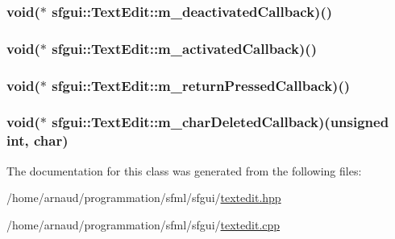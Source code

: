 \hypertarget{classsfgui_1_1TextEdit_bfa97d7c95f54cc91600375242fe1ea6}{
\subsubsection[m\_\-deactivatedCallback]{\setlength{\rightskip}{0pt plus 5cm}void($\ast$ {\bf sfgui::TextEdit::m\_\-deactivatedCallback})()}}
\label{classsfgui_1_1TextEdit_bfa97d7c95f54cc91600375242fe1ea6}


\hypertarget{classsfgui_1_1TextEdit_9cf910f9fca635f595d6a8963d7e30d1}{
\subsubsection[m\_\-activatedCallback]{\setlength{\rightskip}{0pt plus 5cm}void($\ast$ {\bf sfgui::TextEdit::m\_\-activatedCallback})()}}
\label{classsfgui_1_1TextEdit_9cf910f9fca635f595d6a8963d7e30d1}


\hypertarget{classsfgui_1_1TextEdit_d86f9eaadf1313214631b2de009abf55}{
\subsubsection[m\_\-returnPressedCallback]{\setlength{\rightskip}{0pt plus 5cm}void($\ast$ {\bf sfgui::TextEdit::m\_\-returnPressedCallback})()}}
\label{classsfgui_1_1TextEdit_d86f9eaadf1313214631b2de009abf55}


\hypertarget{classsfgui_1_1TextEdit_1538508447c54b9f997fc8a68eb5c097}{
\subsubsection[m\_\-charDeletedCallback]{\setlength{\rightskip}{0pt plus 5cm}void($\ast$ {\bf sfgui::TextEdit::m\_\-charDeletedCallback})(unsigned int, char)}}
\label{classsfgui_1_1TextEdit_1538508447c54b9f997fc8a68eb5c097}




The documentation for this class was generated from the following files:\begin{CompactItemize}
\item 
/home/arnaud/programmation/sfml/sfgui/\hyperlink{textedit_8hpp}{textedit.hpp}\item 
/home/arnaud/programmation/sfml/sfgui/\hyperlink{textedit_8cpp}{textedit.cpp}\end{CompactItemize}
